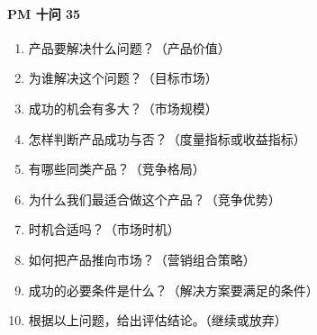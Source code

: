 \documentclass[letterpaper,10pt,english]{sphinxmanual}
\begin{document}
\paragraph{PM 十问 35\sphinxfootnotemark[207]}
\label{\detokenize{chapter_introduction/PM:pm-35}}%
\begin{footnotetext}[207]\sphinxAtStartFootnote
{}
%
\end{footnotetext}\ignorespaces \begin{enumerate}
%
\item {} 
产品要解决什么问题？（产品价值）

\item {} 
为谁解决这个问题？（目标市场）

\item {} 
成功的机会有多大？（市场规模）

\item {} 
怎样判断产品成功与否？（度量指标或收益指标）

\item {} 
有哪些同类产品？（竞争格局）

\item {} 
为什么我们最适合做这个产品？（竞争优势）

\item {} 
时机合适吗？（市场时机）

\item {} 
如何把产品推向市场？（营销组合策略）

\item {} 
成功的必要条件是什么？（解决方案要满足的条件）

\item {} 
根据以上问题，给出评估结论。（继续或放弃）

\end{enumerate}
\end{document}
